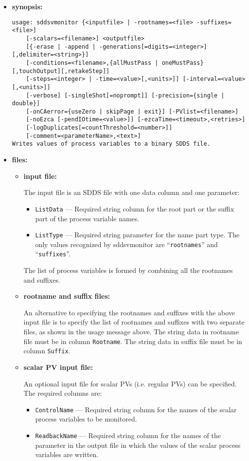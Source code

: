 \begin{itemize}
\item {\bf synopsis:} 
%
%
\begin{verbatim}
usage: sddsvmonitor {<inputfile> | -rootnames=<file> -suffixes=<file>] 
    [-scalars=<filename>] <outputfile> 
    [{-erase | -append | -generations[=digits=<integer>][,delimiter=<string>}]
    [-conditions=<filename>,{allMustPass | oneMustPass}[,touchOutput][,retakeStep]]
    [-steps=<integer> | -time=<value>[,<units>]] [-interval=<value>[,<units>]]
    [-verbose] [-singleShot[=noprompt]] [-precision={single | double}]
    [-onCAerror={useZero | skipPage | exit}] [-PVlist=<filename>]
    [-noEzca [-pendIOtime=<value>]] [-ezcaTime=<timeout>,<retries>]
    [-logDuplicates[=countThreshold=<number>]]
    [-comment=<parameterName>,<text>]
Writes values of process variables to a binary SDDS file.
\end{verbatim}
\item {\bf files:}
\begin{itemize}
\item {\bf input file:}\par
The input file is an SDDS file with one data column and one parameter:
\begin{itemize}
        \item {\tt ListData} --- Required string column for the root part or the suffix part 
                of the process variable names.
        \item {\tt ListType} --- Required string parameter for the name
                part type. The only values recognized by sddsvmonitor are ``\verb+rootnames+'' and ``\verb+suffixes+''.
\end{itemize}
The list of process variables is formed by combining all the rootnames and suffixes.

\item {\bf rootname and suffix files:}\par
An alternative to specifying the rootnames and suffixes with the above input file is
to specify the list of rootnames and suffixes with two separate files, as shown in the usage message
above.
The string data in rootname file must be in column \verb+Rootname+. The string data in suffix file
must be in column \verb+Suffix+. 

\item {\bf scalar PV input file:}\par
An optional input file for scalar PVs (i.e. regular PVs) can be specified. The required columns are:
\begin{itemize}
        \item {\tt ControlName} --- Required string column for the names of the scalar process variables
                to be monitored.
        \item {\tt ReadbackName} --- Required string column for the names of the parameter in the 
                output file in which the values of the scalar process variables are written.
\end{itemize}



\end{itemize}
\end{itemize}

